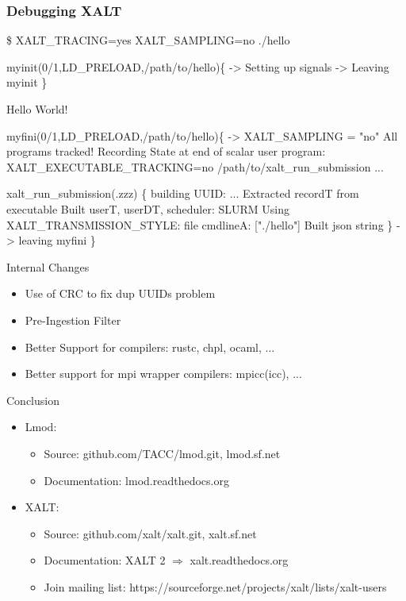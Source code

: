 \documentclass{beamer}
\begin{document}
\begin{frame}[fragile]
    \frametitle{Debugging XALT}
 {\tiny
    \begin{semiverbatim}
\$ XALT\_TRACING=yes XALT\_SAMPLING=no ./hello

myinit(0/1,LD_PRELOAD,/path/to/hello)\{
    -> Setting up signals
    -> Leaving myinit
\}

Hello World!

myfini(0/1,LD_PRELOAD,/path/to/hello)\{
    -> XALT_SAMPLING = "no" All programs tracked!
  Recording State at end of scalar user program:
    XALT_EXECUTABLE_TRACKING=no /path/to/xalt_run_submission ...

  xalt_run_submission(.zzz) \{
    building UUID: ...
    Extracted recordT from executable
    Built userT, userDT, scheduler: SLURM
    Using XALT_TRANSMISSION_STYLE: file
    cmdlineA: ["./hello"]
    Built json string
  \}
    -> leaving myfini
\}
    \end{semiverbatim}
}
\end{frame}


\begin{frame}{Internal Changes}
  \begin{itemize}
    \item Use of CRC to fix dup UUIDs problem
    \item Pre-Ingestion Filter
    \item Better Support for compilers: rustc, chpl, ocaml, ...
    \item Better support for mpi wrapper compilers: mpicc(icc), ...
  \end{itemize}
\end{frame}


\begin{frame}{Conclusion}
  \begin{itemize}
    \item Lmod:
      \begin{itemize}
        \item Source: github.com/TACC/lmod.git, lmod.sf.net
        \item Documentation: lmod.readthedocs.org
      \end{itemize}
    \item XALT:
      \begin{itemize}
        \item Source: github.com/xalt/xalt.git, xalt.sf.net
        \item Documentation: XALT 2 $\Rightarrow$ xalt.readthedocs.org
        \item Join mailing list: https://sourceforge.net/projects/xalt/lists/xalt-users
      \end{itemize}
  \end{itemize}
\end{frame}

%
\end{document}
